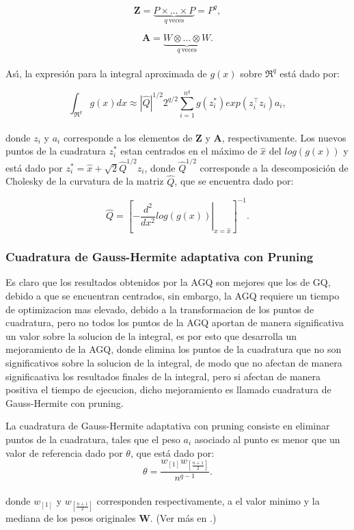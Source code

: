 \[
\textbf{Z}=\underbrace{P \times \ldots \times P}_{q\ \text{veces}}=P^q,
\]

\[
\textbf{A}=\underbrace{W \otimes \ldots \otimes W}_{q\ \text{veces}}.
\]
\\
As\'{\i}, la expresi\'{o}n para la integral aproximada de $g(x)$ sobre $\Re^q$ est\'{a} dado por:

\[
\int_{\Re^q}{g(x)dx}\approx|\hat{Q}|^{1/2} 2^{q/2}\sum_{i=1}^{n^q}g(z_i^*)exp(z_i^{\top}z_i)a_i,
\]
\\
donde $z_i$ y $a_i$ corresponde a los elementos de $\textbf{Z}$ y $\textbf{A}$, respectivamente. Los nuevos puntos de la cuadratura $z_i^*$ estan centrados en el m\'{a}ximo de $\hat{x}$ del $log(g(x))$ y est\'{a} dado por $z_i^*=\hat{x}+\sqrt{2}\hat{Q}^{1/2}z_i$, donde $\hat{Q}^{1/2}$ corresponde a la descomposici\'{o}n de Cholesky de la curvatura de la matriz $\hat{Q}$, que se encuentra dado por:

\[
\hat{Q}={\left[\left. -\frac{d^2}{dx^2}log(g(x))\right|_{x=\hat{x}}\right]^{-1}}.
\]

\subsubsection{Cuadratura de Gauss-Hermite adaptativa con Pruning}

Es claro que los resultados obtenidos por la AGQ son mejores que los de GQ, debido a que se encuentran centrados, sin embargo, la AGQ requiere un tiempo de optimizacion mas elevado, debido a la transformacion de los puntos de cuadratura, pero no todos los puntos de la AGQ aportan de manera significativa un valor sobre la solucion de la integral, es por esto que \cite{Hernandez1} desarrolla un mejoramiento de la AGQ, donde elimina los puntos de la cuadratura que no son significativos sobre la solucion de la integral, de modo que no afectan de manera significaativa los resultados finales de la integral, pero si afectan de manera positiva el tiempo de ejecucion, dicho mejoramiento es llamado cuadratura de Gauss-Hermite con pruning. 

La cuadratura de Gauss-Hermite adaptativa con pruning consiste en eliminar puntos de la cuadratura, tales que el peso $a_i$ asociado al punto es menor que un valor de referencia dado por $\theta$, que est\'{a} dado por:
\[
\theta=\frac{w_{[1]}w_{[\frac{n+1}{2}]}}{n^{q-1}}.
\]
\\
donde $w_{[1]}$ y $w_{[\frac{n+1}{2}]}$ corresponden respectivamente, a el valor minimo y la mediana de los pesos originales \textbf{W}. (Ver m\'{a}s en \cite{Hernandez1}.)



